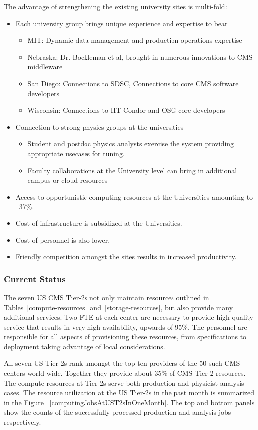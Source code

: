 \documentclass[11pt,a4paper]{article}
\begin{document}
The advantage of strengthening the existing university sites is multi-fold:
\begin{itemize}
\item Each university group brings unique experience and expertise to bear
\begin{itemize}
\item MIT: Dynamic data management and production operations expertise
\item Nebraska: Dr. Bockleman et al, brought in numerous innovations to CMS middleware
\item San Diego: Connections to SDSC, Connections to core CMS software developers
\item Wisconsin: Connections to HT-Condor and OSG core-developers
\end{itemize}
\item Connection to strong physics groups at the universities
\begin{itemize}
\item Student and postdoc physics analysts exercise the system providing
appropriate usecases for tuning. 
\item Faculty collaborations at the University level can bring in additional
campus or cloud resources
\end{itemize}
\item Access to opportunistic computing resources at the Universities amounting to ~37\%.
\item Cost of infrastructure is subsidized at the Universities.
\item Cost of personnel is also lower.
\item Friendly competition amongst the sites results in increased productivity.
\end{itemize}

\subsubsection{Current Status}

The seven US CMS Tier-2s not only maintain resources outlined in 
Tables~\ref{compute-resources}~and~\ref{storage-resources}, but
also provide many additional services.  Two FTE at each center
are necessary to provide high-quality service that results in 
very high availability, upwards of 95\%. The personnel are responsible
for all aspects of provisioning these resources, from specifications to
deployment taking advantage of local considerations. 

All seven US Tier-2s rank amongst the top ten providers of the 50 such 
CMS centers world-wide. Together they provide about 35\% of CMS
Tier-2 resources.  The compute resources at Tier-2s serve both
production and physicist analysis cases.  The resource utilization
at the US Tier-2s in the past month is summarized in the Figure~
\ref{computingJobsAtUST2sInOneMonth}. The top and bottom panels
show the counts of the successfully processed production and analysis 
jobs respectively.
\end{document}
